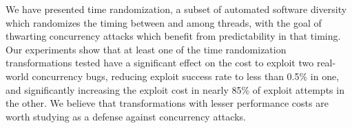 We have presented time randomization, a subset of automated software diversity which randomizes the timing between and among threads, with the goal of thwarting concurrency attacks which benefit from predictability in that timing.
Our experiments show that at least one of the time randomization transformations tested have a significant effect on the cost to exploit two real-world concurrency bugs, reducing exploit success rate to less than 0.5\% in one, and significantly increasing the exploit cost in nearly 85\% of exploit attempts in the other.
We believe that transformations with lesser performance costs are worth studying as a defense against concurrency attacks.